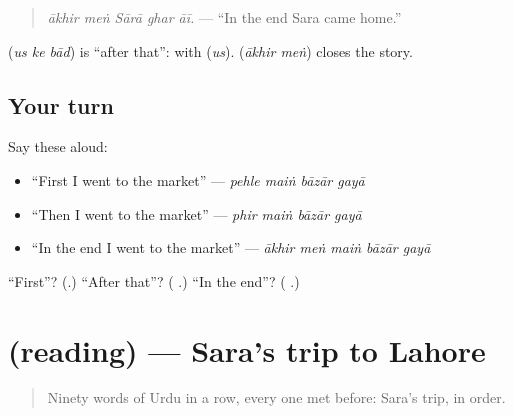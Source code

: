 \begin{quote}
\textbf{    }
\end{quote}

\begin{quote}
\emph{ākhir meṅ Sārā ghar āī.} — \textquotedblleft{}In the end Sara came home.\textquotedblright{}
\end{quote}

\textbf{  } (\emph{us ke bād}) is \textquotedblleft{}after that\textquotedblright{}: \textbf{} with \textbf{} (\emph{us}). \textbf{ } (\emph{ākhir meṅ}) closes the story.

\subsection*{Your turn}
Say these aloud:

\begin{itemize}
\raggedright
  \item \textquotedblleft{}First I went to the market\textquotedblright{} — \emph{pehle maiṅ bāzār gayā}
  \item \textquotedblleft{}Then I went to the market\textquotedblright{} — \emph{phir maiṅ bāzār gayā}
  \item \textquotedblleft{}In the end I went to the market\textquotedblright{} — \emph{ākhir meṅ maiṅ bāzār gayā}
\end{itemize}

\begin{tcolorbox}[breakable,colback=teal!4,colframe=teal!35!black,title={Before you move on}]
\textquotedblleft{}First\textquotedblright{}? (\textbf{}.) \textquotedblleft{}After that\textquotedblright{}? (\textbf{  }.) \textquotedblleft{}In the end\textquotedblright{}? (\textbf{ }.)
\end{tcolorbox}
\section[(reading)]{(reading) — Sara's trip to Lahore}

\label{lesson:UR-C267-sara-ka-safar}



\begin{quote}
Ninety words of Urdu in a row, every one met before: Sara's trip, in order.
\end{quote}

